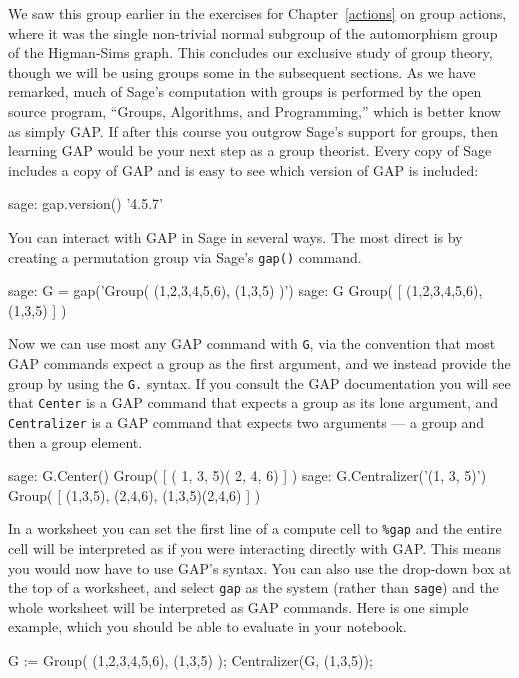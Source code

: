 %
We saw this group earlier in the exercises for Chapter~\ref{actions} on group actions, where it was the single non-trivial normal subgroup of the automorphism group of the Higman-Sims graph.
%
%
This concludes our exclusive study of group theory, though we will be using groups some in the subsequent sections.  As we have remarked, much of Sage's computation with groups is performed by the open source program, ``Groups, Algorithms, and Programming,'' which is better know as simply GAP.  If after this course you outgrow Sage's support for groups, then learning GAP would be your next step as a group theorist. Every copy of Sage includes a copy of GAP and is easy to see which version of GAP is included:
%
\begin{sageexample}
sage: gap.version()
'4.5.7'
\end{sageexample}
%
You can interact with GAP in Sage in several ways. The most direct is by creating a permutation group via Sage's \verb?gap()? command.
%
\begin{sageexample}
sage: G = gap('Group( (1,2,3,4,5,6), (1,3,5) )')
sage: G
Group( [ (1,2,3,4,5,6), (1,3,5) ] )
\end{sageexample}
%
Now we can use most any GAP command with \verb?G?, via the convention that most GAP commands expect a group as the first argument, and we instead provide the group by using the \verb?G.? syntax.  If you consult the GAP documentation you will see that \verb?Center? is a GAP command that expects a group as its lone argument, and \verb?Centralizer? is a GAP command that expects two arguments --- a group and then a group element.
%
\begin{sageexample}
sage: G.Center()
Group( [ ( 1, 3, 5)( 2, 4, 6) ] )
sage: G.Centralizer('(1, 3, 5)')
Group( [ (1,3,5), (2,4,6), (1,3,5)(2,4,6) ] )
\end{sageexample}
%
In a worksheet you can set the first line of a compute cell to \verb?%gap? and the entire cell will be interpreted as if you were interacting directly with GAP.  This means you would now have to use GAP's syntax.  You can also use the drop-down box at the top of a worksheet, and select \verb?gap? as the system (rather than \verb?sage?) and the whole worksheet will be interpreted as GAP commands.  Here is one simple example, which you should be able to evaluate in your notebook.
%
\begin{sageverbatim}
G := Group( (1,2,3,4,5,6), (1,3,5) );
Centralizer(G, (1,3,5));
\end{sageverbatim}
